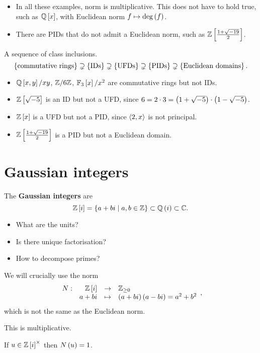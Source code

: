 \begin{remark1}
\hfill
\begin{itemize}
\item In all these examples, norm is multiplicative. This does not have to hold true, such as $ \mathbb{Q}\left[ x \right] $, with Euclidean norm $ f \mapsto \deg\left( f \right) $.
\item There are PIDs that do not admit a Euclidean norm, such as $ \mathbb{Z}\left[ \tfrac{1 + \sqrt{-19}}{2} \right] $.
\end{itemize}
\end{remark1}

A sequence of class inclusions.
$$ \left\{ \text{commutative rings} \right\} \supsetneq \left\{ \text{IDs} \right\} \supsetneq \left\{ \text{UFDs} \right\} \supsetneq \left\{ \text{PIDs} \right\} \supsetneq \left\{ \text{Euclidean domains} \right\}. $$
\begin{itemize}
\item $ \mathbb{Q}\left[ x, y \right] / xy $, $ \mathbb{Z} / 6\mathbb{Z} $, $ \mathbb{F}_3\left[ x \right] / x^2 $ are commutative rings but not IDs.
\item $ \mathbb{Z}\left[ \sqrt{-5} \right] $ is an ID but not a UFD, since $ 6 = 2 \cdot 3 = \left( 1 + \sqrt{-5} \right) \cdot \left( 1 - \sqrt{-5} \right) $.
\item $ \mathbb{Z}\left[ x \right] $ is a UFD but not a PID, since $ \left\langle 2, x \right\rangle $ is not principal.
\item $ \mathbb{Z}\left[ \tfrac{1 + \sqrt{-19}}{2} \right] $ is a PID but not a Euclidean domain.
\end{itemize}

\section{Gaussian integers}

The \textbf{Gaussian integers} are
$$ \mathbb{Z}\left[ i \right] = \left\{ a + bi \mid a, b \in \mathbb{Z} \right\} \subset \mathbb{Q}\left( i \right) \subset \mathbb{C}. $$
\begin{itemize}
\item What are the units?
\item Is there unique factorisation?
\item How to decompose primes?
\end{itemize}

We will crucially use the norm
$$ \function[N]{\Z\sb{i}}{\Z_{\ge 0}}{a + bi}{\rb{a + bi}\rb{a - bi} = a^2 + b^2}, $$
which is not the same as the Euclidean norm.

\begin{note}
This is multiplicative.
\end{note}

\begin{proposition}
If $ u \in \mathbb{Z}\left[ i \right]^\times $ then $ N\left( u \right) = 1 $.
\end{proposition}

